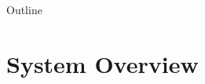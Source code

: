 \documentclass{beamer}
\begin{document}
\begin{frame}{Outline}
  \tableofcontents
\end{frame}

\section{System Overview}



\end{document}
